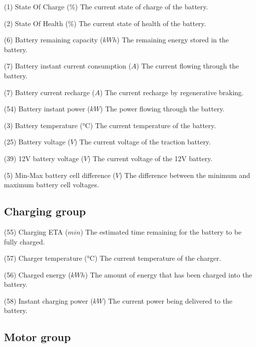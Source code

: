 {(1) State Of Charge (\%)}
{The current state of charge of the battery.}

{(2) State Of Health (\%)}
{The current state of health of the battery.}

{(6) Battery remaining capacity (\(kWh\))}
{The remaining energy stored in the battery.}

{(7) Battery instant current consumption (\(A\))}
{The current flowing through the battery.}

{(7) Battery current recharge (\(A\))}
{The current recharge by regenerative braking.}

{(54) Battery instant power (\(kW\))}
{The power flowing through the battery.}

{(3) Battery temperature (°C)}
{The current temperature of the battery.}

{(25) Battery voltage (\(V\))}
{The current voltage of the traction battery.}

{(39) 12V battery voltage (\(V\))}
{The current voltage of the 12V battery.}

{(5) Min-Max battery cell difference (\(V\))}
{The difference between the minimum and maximum battery cell voltages.}

\subsection{Charging group}

{(55) Charging ETA (\(min\))}
{The estimated time remaining for the battery to be fully charged.}

{(57) Charger temperature (°C)}
{The current temperature of the charger.}

{(56) Charged energy (\(kWh\))}
{The amount of energy that has been charged into the battery.}

{(58) Instant charging power (\(kW\))}
{The current power being delivered to the battery.}

\subsection{Motor group}

